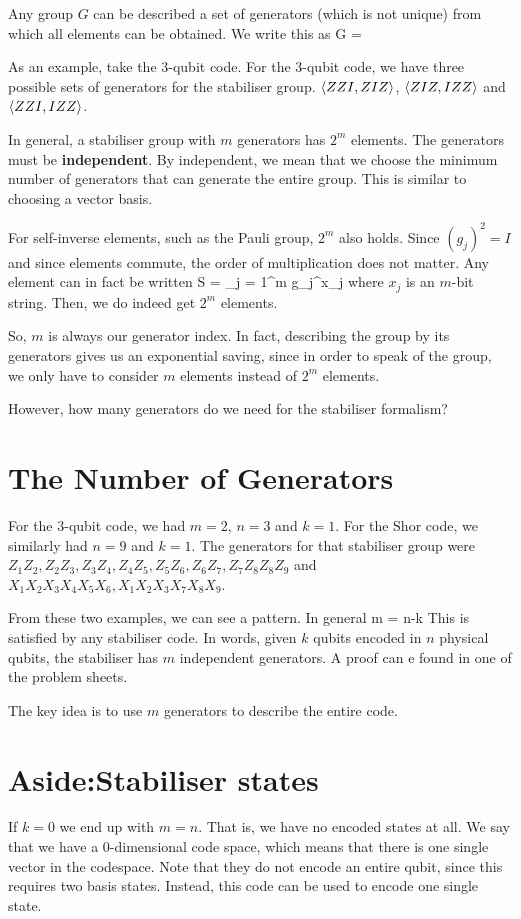 Any group $G$ can be described a set of generators (which is not unique) from which all elements can be obtained. We write this as
\beq
G = 
\eeq

As an example, take the 3-qubit code. For the 3-qubit code, we have three possible sets of generators for the stabiliser group. $\left\langle ZZI, ZIZ \right\rangle$, $\left\langle ZIZ, IZZ \right\rangle$ and $\left\langle ZZI, IZZ \right\rangle$. 

In general, a stabiliser group with $m$ generators has $2^m$ elements. The generators must be \textbf{independent}. By independent, we mean that we choose the minimum number of generators that can generate the entire group. This is similar to choosing a vector basis. 

For self-inverse elements, such as the Pauli group, $2^m$ also holds. Since $(g_j)^2 = I$ and since elements commute, the order of multiplication does not matter. Any element can in fact be written
\beq
S = \prod_{j = 1}^m g_j^{x_j}
\eeq
where $x_j$ is an $m$-bit string. Then, we do indeed get $2^m$ elements. 

So, $m$ is always our generator index. In fact, describing the group by its generators gives us an exponential saving, since in order to speak of the group,  we only have to consider $m$ elements instead of $2^m$ elements. 

However, how many generators do we need for the stabiliser formalism? 

\section{The Number of Generators}
For the 3-qubit code, we had $m = 2$, $n = 3$ and $k = 1$. For the Shor code, we similarly had $n = 9$ and $k = 1$. The generators for that stabiliser group were $Z_1Z_2, Z_2Z_3, Z_3Z_4, Z_4Z_5, Z_5Z_6, Z_6Z_7, Z_7Z_8Z_8Z_9$ and $X_1X_2X_3X_4X_5X_6, X_1X_2X_3X_7X_8X_9$. 

From these two examples, we can see a pattern. In general
\beq
m = n-k
\eeq
This is satisfied by any stabiliser code. In words, given $k$ qubits encoded in $n$ physical qubits, the stabiliser has $m$ independent generators. A proof can e found in one of the problem sheets. 

The key idea is to use $m$ generators to describe the entire code. 

\section{Aside:Stabiliser states}
If $k = 0$ we end up with $m = n$. That is, we have no encoded states at all. We say that we have a 0-dimensional code space, which means that there is one single vector in the codespace. Note that they do not encode an entire qubit, since this requires two basis states. Instead, this code can be used to encode one single state. 

